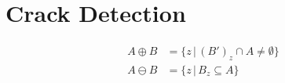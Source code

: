 \section{Crack Detection}\label{sec:crack_detection}

\begin{align}
    A \oplus B &= \{z \,|\, (B')_z \cap A \neq \emptyset\} \\
    A \ominus B &= \{z \,|\, B_z \subseteq A\}
\end{align}